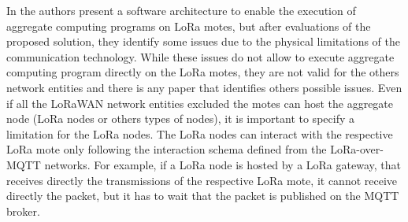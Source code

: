 In \cite{CCNCPS2018} the authors present a software architecture to enable the execution of aggregate computing programs on LoRa motes, but after evaluations of the proposed solution, they identify some issues due to the physical limitations of the communication technology. 
While these issues do not allow to execute aggregate computing program directly on the LoRa motes, they are not valid for the others network entities and there is any paper that identifies others possible issues.
Even if all the LoRaWAN network entities excluded the motes can host the aggregate node (LoRa nodes or others types of nodes), it is important to specify a limitation for the LoRa nodes. 
The LoRa nodes can interact with the respective LoRa mote only following the interaction schema defined from the LoRa-over-MQTT networks. 
For example, if a LoRa node is hosted by a LoRa gateway, that receives directly the transmissions of the respective LoRa mote, it cannot receive directly the packet, but it has to wait that the packet is published on the MQTT broker.

